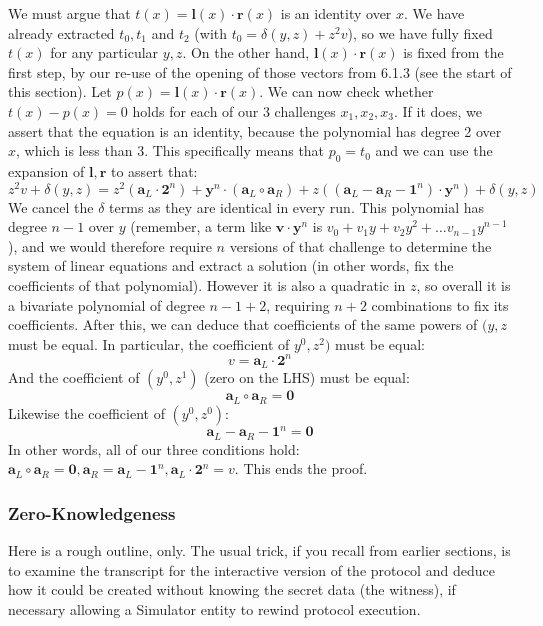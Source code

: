 \documentclass[10pt,a4paper]{article}
\begin{document}
We must argue that $t(x) = \textbf{l}(x) \cdot \textbf{r}(x)$ is an identity over $x$. We have already extracted $t_0, t_1$ and $t_2$
(with $t_0 = \delta(y, z) + z^2v$), so we have fully fixed $t(x)$ for any particular $y,z$. On the other hand, $\textbf{l}(x) \cdot \textbf{r}(x)$
is fixed from the first step, by our re-use of the opening of those
vectors from 6.1.3 (see the start of this section). Let $p(x) = \textbf{l}(x) \cdot \textbf{r}(x)$. We can now
check whether $t(x) -p(x) = 0$ holds for each of our 3 challenges $x_1, x_2, x_3$. If it does, we assert
that the equation is an identity, because the polynomial has degree 2
over $x$, which is less than 3. This specifically means that $p_0 = t_0$ and we can use
the expansion of $\mathbf{l}, \mathbf{r}$ to assert that:
\[z^2v + \delta(y, z) = z^2(\textbf{a}_L \cdot \textbf{2}^n) + \textbf{y}^n \cdot (\textbf{a}_L \circ \textbf{a}_R) + z((\textbf{a}_L - \textbf{a}_R - \textbf{1}^n) \cdot \textbf{y}^n) + \delta(y, z)\]
We cancel the $\delta$ terms as they are identical in every run. This polynomial
has degree $n-1$ over $y$ (remember, a term like $\textbf{v}\cdot\textbf{y}^n$ is $v_0 + v_1y + v_2y^2 + \ldots v_{n-1}y^{n-1}$), and we would therefore
require $n$ versions of that challenge to determine the system of linear
equations and extract a solution (in other words, fix the coefficients
of that polynomial). However it is also a quadratic in $z$, so overall it
is a bivariate polynomial of degree $n-1+2$, requiring $n+2$ combinations to fix its
coefficients. After this, we can deduce that coefficients of the same
powers of $(y,z$ must be equal. In particular, the coefficient of $y^0, z^2)$ must be
equal:
\[v =\textbf{a}_L \cdot \textbf{2}^n \]
And the coefficient of $(y^0, z^1)$ (zero on the LHS) must be equal:
\[\textbf{a}_L \circ \textbf{a}_R = \textbf{0}\]
Likewise the coefficient of $(y^0, z^0)$:
\[\textbf{a}_L - \textbf{a}_R -\textbf{1}^n = \textbf{0}\]
In other words, all of our three conditions hold: $\textbf{a}_L \circ \textbf{a}_R = \textbf{0}, \textbf{a}_R = \textbf{a}_L - \textbf{1}^n, \textbf{a}_L \cdot \textbf{2}^n = v$. This ends the proof.

\hypertarget{zero-knowledgeness-1}{%
\subsubsection[Zero-Knowledgeness]{\texorpdfstring{\protect\hypertarget{anchor-65}{}{}Zero-Knowledgeness}{Zero-Knowledgeness}}\label{zero-knowledgeness-1}}

Here is a rough outline, only. The usual trick, if you recall from
earlier sections, is to examine the transcript for the interactive
version of the protocol and deduce how it could be created without
knowing the secret data (the witness), if necessary allowing a Simulator
entity to rewind protocol execution.
\end{document}
